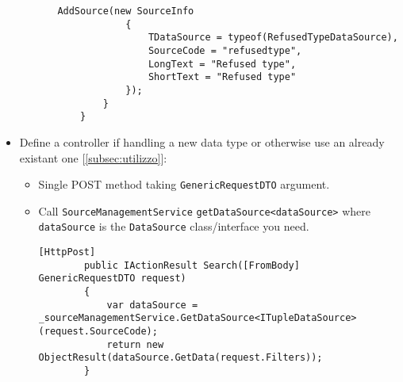 \begin{itemize}
\begin{itemize}
\begin{itemize}
\begin{lstlisting}[caption={TupleDiscoveryConfiguration example}, style=javaScriptCode]
            AddSource(new SourceInfo
            {
                TDataSource = typeof(RefusedTypeDataSource),
                SourceCode = "refusedtype",
                LongText = "Refused type",
                ShortText = "Refused type"
            });
        }
    }                
            \end{lstlisting}
        \end{itemize}
    \end{itemize}
    \item Define a controller if handling a new data type or otherwise use an already existant one [\ref{subsec:utilizzo}]:
    \begin{itemize}
        \item Single POST method taking \verb|GenericRequestDTO| argument.
        \item Call \verb|SourceManagementService| \verb|getDataSource<dataSource>| where \verb|dataSource| is the \verb|DataSource| class/interface you need.
        \begin{lstlisting}[caption={NON SO COSA METTERE example}, style=javaScriptCode]
        [HttpPost]
        public IActionResult Search([FromBody] GenericRequestDTO request)
        {
            var dataSource = _sourceManagementService.GetDataSource<ITupleDataSource>(request.SourceCode);
            return new ObjectResult(dataSource.GetData(request.Filters));
        }
        \end{lstlisting}
    \end{itemize}
\end{itemize}
